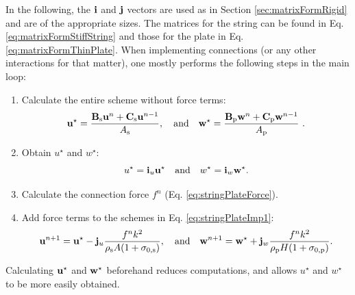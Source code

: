 In the following, the $\mathbf{i}$ and $\mathbf{j}$ vectors are used as in Section \ref{sec:matrixFormRigid} and are of the appropriate sizes. The matrices for the string can be found in Eq. \eqref{eq:matrixFormStiffString} and those for the plate in Eq. \eqref{eq:matrixFormThinPlate}. When implementing connections (or any other interactions for that matter), one mostly performs the following steps in the main loop:
\begin{enumerate}
    \item Calculate the entire scheme without force terms:\\
    \vspace{-0.5em}\begin{equation}\label{eq:stringPlateImp1}
        \u^\star = \frac{\B_\stxt\u^n + \C_\stxt\u^{n-1}}{A_\stxt}, \qaq \w^\star = \frac{\B_\ptxt\w^n + \C_\ptxt\w^{n-1}}{A_\ptxt}\ .
    \end{equation}
    \item Obtain $u^\star$ and $w^\star$:\\
    \vspace{-1em}\begin{equation}\label{eq:stringPlateImp2}
       u^\star = \mathbf{i}_u \mathbf{u}^\star \quad \text{and} \quad w^\star = \mathbf{i}_w \mathbf{w}^\star.
    \end{equation}
    \item Calculate the connection force $f^n$ (Eq. \eqref{eq:stringPlateForce}).
    \item Add force terms to the schemes in Eq. \eqref{eq:stringPlateImp1}:\\
    \begin{equation}\label{eq:stringPlateImp4}
        \u^{n+1} = \u^{\star} - \j_u \frac{f^n k^2}{\rho_\stxt A (1+\szX[\stxt])},\qaq \w^{n+1} = \w^{\star} + \j_w \frac{f^n k^2}{\rho_\ptxt H (1+\szX[\ptxt])}.
    \end{equation} 
\end{enumerate}
Calculating $\mathbf{u}^\star$ and $\mathbf{w}^\star$ beforehand reduces computations, and allows $u^\star$ and $w^\star$ to be more easily obtained. 

